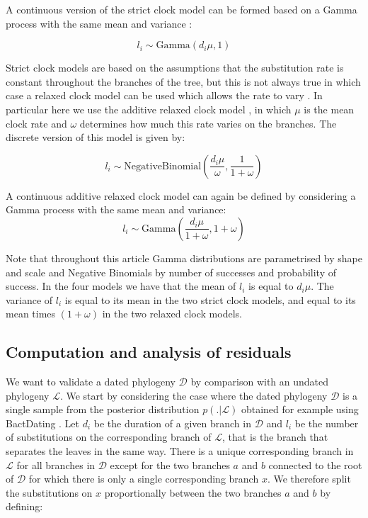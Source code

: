 \documentclass{article}
\begin{document}
A continuous version of the strict clock model can be formed based on a Gamma process with the same mean and variance \citep{Didelot2021}:

\begin{equation}
l_i \sim \mathrm{Gamma}(d_i \mu,1)
\label{eq:csc}
\end{equation}

Strict clock models are based on the assumptions that the substitution rate is constant throughout the branches
of the tree, but this is not always true in which case a relaxed clock model can be used which allows
the rate to vary \citep{Drummond2006}. In particular here we use the additive relaxed clock model \citep{Didelot2021},
in which $\mu$ is the mean clock rate and $\omega$ determines how much this rate varies on the branches.
The discrete version of this model is given by: 

\begin{equation}
l_i \sim \mathrm{NegativeBinomial}\left(\frac{d_i \mu}{\omega},\frac{1}{1+\omega}\right)
\label{eq:arc}
\end{equation}

A continuous additive relaxed clock model can again be defined by considering a Gamma process with the same mean and variance:
\begin{equation}
l_i \sim \mathrm{Gamma}\left(\frac{d_i \mu}{1+\omega},1+\omega\right)
\label{eq:carc}
\end{equation}

Note that throughout this article Gamma distributions are parametrised by shape and scale and Negative Binomials 
by number of successes and probability of success. In the four models we have that the mean of $l_i$ is equal to
$d_i \mu$. The variance of $l_i$ is equal to its mean in the two strict clock models, and equal to its mean 
times $(1+\omega)$ in the two relaxed clock models.

\subsection*{Computation and analysis of residuals}

We want to validate a dated phylogeny $\mathcal{D}$ by comparison with an undated phylogeny $\mathcal{L}$. We start by considering the case where the dated phylogeny $\mathcal{D}$ is a single sample from the posterior distribution $p(.|\mathcal{L})$ obtained for example using BactDating \citep{Didelot2018}.
Let $d_i$ be the duration of a given branch in $\mathcal{D}$ and $l_i$ be the number of substitutions on the corresponding branch of $\mathcal{L}$, that is the branch that separates the leaves in the same way. There is a unique corresponding branch in $\mathcal{L}$ for all branches in $\mathcal{D}$ except for the two branches $a$ and $b$ connected to the root of $\mathcal{D}$ for which there is only a single corresponding branch $x$. We therefore split the substitutions on $x$ proportionally between the two branches $a$ and $b$ by defining:
\end{document}
